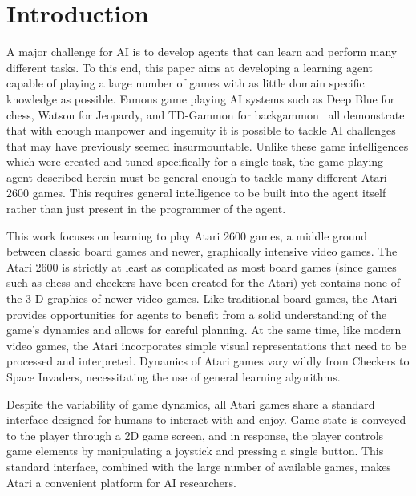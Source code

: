 \documentclass{sig-alternate}
\begin{document}


\section{Introduction}
A major challenge for AI is to develop agents that can learn and perform many different tasks. To this end, this paper aims at developing a learning agent capable of playing a large number of games with as little domain specific knowledge as possible. Famous game playing AI systems such as Deep Blue for chess, Watson for Jeopardy, and TD-Gammon for backgammon~\cite{tesauro_94} all demonstrate that with enough manpower and ingenuity it is possible to tackle AI challenges that may have previously seemed insurmountable. Unlike these game intelligences which were created and tuned specifically for a single task, the game playing agent described herein must be general enough to tackle many different Atari 2600 games. This requires general intelligence to be built into the agent itself rather than just present in the programmer of the agent.

This work focuses on learning to play Atari 2600 games, a middle ground between classic board games and newer, graphically intensive video games. The Atari 2600 is strictly at least as complicated as most board games (since games such as chess and checkers have been created for the Atari) yet contains none of the 3-D graphics of newer video games. Like traditional board games, the Atari provides opportunities for agents to benefit from a solid understanding of the game's dynamics and allows for careful planning. At the same time, like modern video games, the Atari incorporates simple visual representations that need to be processed and interpreted. Dynamics of Atari games vary wildly from Checkers to Space Invaders, necessitating the use of general learning algorithms.

Despite the variability of game dynamics, all Atari games share a standard interface designed for humans to interact with and enjoy. Game state is conveyed to the player through a 2D game screen, and in response, the player controls game elements by manipulating a joystick and pressing a single button. This standard interface, combined with the large number of available games, makes Atari a convenient platform for AI researchers. 
\end{document}

